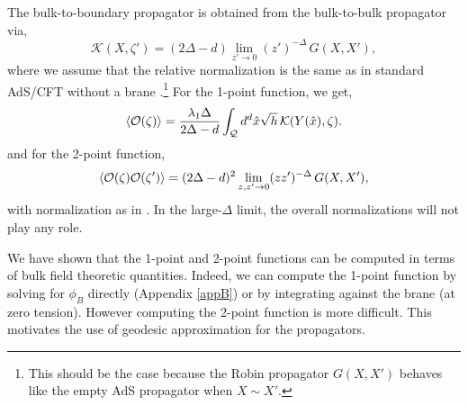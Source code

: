 \documentclass[reprint,amsmath,amssymb,aps,nofootinbib,twocolumn]{revtex4-2}
\begin{document}
The bulk-to-boundary propagator is obtained from the bulk-to-bulk propagator via,
\begin{equation}
\mathcal{K}(X,\zeta') = (2\Delta - d) \lim_{z'\rightarrow 0}(z')^{-\Delta}\,G(X,X'),
\end{equation}
where we assume that the relative normalization is the same as in standard AdS\slash CFT without a brane \cite{giddings_boundary_1999,Klebanov:1999tb}.\footnote{This should be the case because the Robin propagator $ G(X,X') $ behaves like the empty AdS propagator when $ X \sim X' $.} For the 1-point function, we get,
\begin{equation}
\expval{\mathcal{O}(\zeta)} = \frac{\lambda_1\Delta}{2\Delta - d}\int_{\mathcal{Q}}d^d\hat{x} \sqrt{h}\,\mathcal{K}(Y(\hat{x}),\zeta).
\label{1pointK}
\end{equation}
and for the 2-point function,
\begin{equation}
\expval{\mathcal{O}(\zeta)\mathcal{O}(\zeta')} = (2\Delta - d)^{2}\lim_{z,z'\rightarrow 0}(zz')^{-\Delta}\,G(X,X'),
\label{extr}
\end{equation}
with normalization as in \cite{harlow_operator_2011}. In the large-$ \Delta $ limit, the overall normalizations will not play any role.

We have shown that the 1-point and 2-point functions can be computed in terms of bulk field theoretic quantities. Indeed, we can compute the 1-point function by solving for $\phi_B$ directly (Appendix \ref{appB}) or by integrating against the brane (at zero tension). However computing the 2-point function is more difficult. This motivates the use of geodesic approximation for the propagators.

\end{document}
